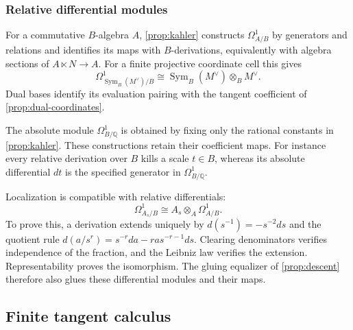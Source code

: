 \documentclass[11pt,a4paper]{article}
\numberwithin{algorithm}{section}
\numberwithin{equation}{section}
\theoremstyle{definition}
\theoremstyle{remark}
\theoremstyle{plain}
\newcommand{\QQ}{\mathbb Q}
\newcommand{\Sym}{\operatorname{Sym}}
\theoremstyle{definition}
\theoremstyle{plain}
\begin{document}
\subsubsection{Relative differential modules}
For a commutative $B$-algebra $A$, \cref{prop:kahler} constructs
$\Omega^1_{A/B}$ by generators and relations and identifies its maps
with $B$-derivations, equivalently with algebra sections of
$A\ltimes N\to A$.
For a finite projective coordinate cell this gives
\[
 \Omega^1_{\Sym_B(M^\vee)/B}
 \cong \Sym_B(M^\vee)\otimes_BM^\vee.
\]
Dual bases identify its evaluation pairing with the tangent
coefficient of \cref{prop:dual-coordinates}.

The absolute module $\Omega^1_{B/\QQ}$ is obtained by fixing
only the rational constants in \cref{prop:kahler}.
These constructions retain their coefficient maps.
For instance every relative derivation over $B$ kills a
scale $t\in B$, whereas its absolute differential $dt$ is
the specified generator in $\Omega^1_{B/\QQ}$.

Localization is compatible with relative differentials:
\[
 \Omega^1_{A_s/B}\cong A_s\otimes_A\Omega^1_{A/B}.
\]
To prove this, a derivation extends uniquely by
$d(s^{-1})=-s^{-2}ds$ and the quotient rule
$d(a/s^r)=s^{-r}da-r a s^{-r-1}ds$.
Clearing denominators verifies independence of the fraction,
and the Leibniz law verifies the extension.
Representability proves the isomorphism.
The gluing equalizer of \cref{prop:descent} therefore
also glues these differential modules and their maps.


\subsection{Finite tangent calculus}
\label{sec:finite-tangents}
\end{document}
